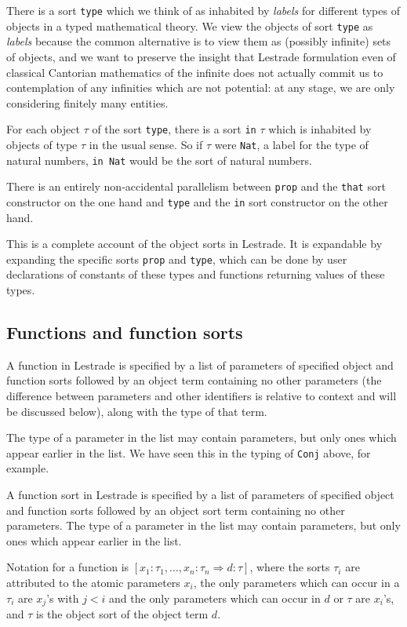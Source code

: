 \documentclass[12pt]{article}
\begin{document}
There is a sort {\tt type} which we think of as inhabited by {\em labels\/} for different types of objects in a typed mathematical theory.  We view the objects of sort {\tt type} as {\em labels\/} because the common alternative is to view them as (possibly infinite) sets of objects, and we want to preserve the insight that Lestrade formulation even of classical Cantorian mathematics of the infinite does not actually commit us to contemplation of any infinities which are not potential:  at any stage, we are only considering finitely many entities.

For each object $\tau$ of the sort {\tt type}, there is a sort {\tt in} $\tau$ which is inhabited by objects of type $\tau$ in the usual sense.  So if $\tau$ were {\tt Nat}, a label for the type of natural numbers, {\tt in Nat} would be the sort of natural numbers.

There is an entirely non-accidental parallelism between {\tt prop} and the {\tt that} sort constructor on the one hand
and {\tt type} and the {\tt in} sort constructor on the other hand.

This is a complete account of the object sorts in Lestrade.  It is expandable by expanding the specific sorts
{\tt prop} and {\tt type}, which can be done by user declarations of constants of these types and functions returning values of these types.

\subsection{Functions and function sorts}

A function in Lestrade is specified by a list of parameters of specified object and function sorts followed
by an object term containing no other parameters (the difference between parameters and other identifiers is relative to context and will be discussed below), along with the type of that term.

The type of a parameter in the list may contain parameters, but only ones which appear earlier in the list.  We have seen this in the typing of {\tt Conj} above, for example. 

A function sort in Lestrade is specified by a list of parameters of specified object and function sorts followed
by an object sort term containing no other parameters.  The type of a parameter in the list may contain parameters, but only ones which appear earlier in the list.

Notation for a function is $[x_1:\tau_1,\ldots,x_n:\tau_n \Rightarrow d:\tau]$, where the sorts $\tau_i$ are
attributed to the atomic parameters $x_i$, the only parameters which can occur in a $\tau_i$ are $x_j$'s with $j<i$
and the only parameters which can occur in $d$ or $\tau$ are $x_i$'s, and $\tau$ is the object sort of the object term $d$.
\end{document}

